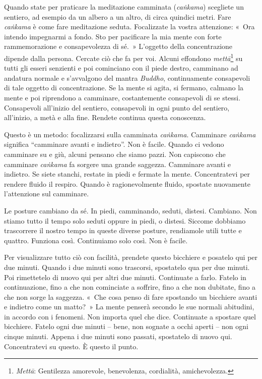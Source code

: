 Quando state per praticare la meditazione camminata (\emph{caṅkama})
scegliete un sentiero, ad esempio da un albero a un altro, di circa
quindici metri. Fare \emph{caṅkama} è come fare meditazione seduta.
Focalizzate la vostra attenzione: «~Ora intendo impegnarmi a fondo. Sto
per pacificare la mia mente con forte rammemorazione e consapevolezza di
sé.~» L'oggetto della concentrazione dipende dalla persona. Cercate ciò
che fa per voi. Alcuni effondono \emph{mettā}\footnote{\emph{Mettā}:
  Gentilezza amorevole, benevolenza, cordialità, amichevolezza.} su
tutti gli esseri senzienti e poi cominciano con il piede destro,
camminano ad andatura normale e s'avvalgono del mantra \emph{Buddho},
continuamente consapevoli di tale oggetto di concentrazione. Se la mente
si agita, si fermano, calmano la mente e poi riprendono a camminare,
costantemente consapevoli di se stessi. Consapevoli all'inizio del
sentiero, consapevoli in ogni punto del sentiero, all'inizio, a metà e
alla fine. Rendete continua questa conoscenza.

Questo è un metodo: focalizzarsi sulla camminata \emph{caṅkama}.
Camminare \emph{caṅkama} significa ``camminare avanti e indietro''. Non
è facile. Quando ci vedono camminare su e giù, alcuni pensano che siamo
pazzi. Non capiscono che camminare \emph{caṅkama} fa sorgere una grande
saggezza. Camminare avanti e indietro. Se siete stanchi, restate in
piedi e fermate la mente. Concentratevi per rendere fluido il respiro.
Quando è ragionevolmente fluido, spostate nuovamente l'attenzione sul
camminare.

Le posture cambiano da sé. In piedi, camminando, seduti, distesi.
Cambiano. Non stiamo tutto il tempo solo seduti oppure in piedi, o
distesi. Siccome dobbiamo trascorrere il nostro tempo in queste diverse
posture, rendiamole utili tutte e quattro. Funziona così. Continuiamo
solo così. Non è facile.

Per visualizzare tutto ciò con facilità, prendete questo bicchiere e
posatelo qui per due minuti. Quando i due minuti sono trascorsi,
spostatelo qua per due minuti. Poi rimettetelo di nuovo qui per altri
due minuti. Continuate a farlo. Fatelo in continuazione, fino a che non
cominciate a soffrire, fino a che non dubitate, fino a che non sorge la
saggezza. «~Che cosa penso di fare spostando un bicchiere avanti e
indietro come un matto?~» La mente penserà secondo le sue normali
abitudini, in accordo con i fenomeni. Non importa quel che dice.
Continuate a spostare quel bicchiere. Fatelo ogni due minuti -- bene,
non sognate a occhi aperti -- non ogni cinque minuti. Appena i due
minuti sono passati, spostatelo di nuovo qui. Concentratevi su questo. È
questo il punto.

